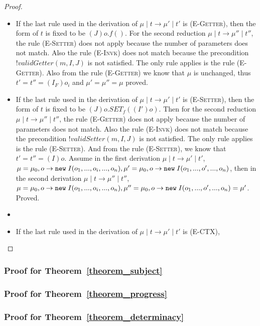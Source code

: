 \begin{proof}
\begin{itemize}
	\item If the last rule used in the derivation of $\mu \mid t \to \mu' \mid t'$ is \textsc{(E-Getter)}, then the form of $t$ is fixed to be $(J)o.f()$. For the second reduction $\mu \mid t \to \mu'' \mid t''$, the rule \textsc{(E-Setter)} does not apply because the number of parameters does not match. Also the rule \textsc{(E-Invk)} does not match because the precondition $!validGetter(m, I, J)$ is not satisfied. The only rule applies  is the rule \textsc{(E-Getter)}. Also from the rule \textsc{(E-Getter)} we know that $\mu$ is unchanged, thus $t' = t'' = (I_F)o_i$ and $\mu' = \mu'' = \mu$ proved.
	
	\item If the last rule used in the derivation of $\mu \mid t \to \mu' \mid t'$ is \textsc{(E-Setter)}, then the form of $t$ is fixed to be $(J)o.SET_f((I')o)$. Then for the second reduction $\mu \mid t \to \mu'' \mid t''$, the rule \textsc{(E-Getter)} does not apply because the number of parameters does not match. Also the rule \textsc{(E-Invk)} does not match because the precondition $!validSetter(m, I, J)$ is not satisfied. The only rule applies is the rule \textsc{(E-Setter)}. And from the rule \textsc{(E-Setter)}, we know that $t' = t'' = (I)o$. Assume in the first derivation $\mu \mid t \to \mu' \mid t'$, $\mu = \mu_0, o \to \texttt{new} \; I(o_1,...,o_i,...,o_n), \mu' = \mu_0, o \to \texttt{new} \; I(o_1,...,o',...,o_n)$, then in the second derivation $\mu \mid t \to \mu'' \mid t''$, $\mu = \mu_0, o \to \texttt{new} \; I(o_1,...,o_i,...,o_n), \mu'' = \mu_0, o \to \texttt{new} \; I(o_1,...,o',...,o_n) = \mu'$. Proved.

	\item \item If the last rule used in the derivation of $\mu \mid t \to \mu' \mid t'$ is \textsc{(E-CTX)}, 
\end{itemize}
\end{proof}


\subsubsection{Proof for Theorem~\ref{theorem_subject}}



\subsubsection{Proof for Theorem~\ref{theorem_progress}}



\subsubsection{Proof for Theorem~\ref{theorem_determinacy}}
